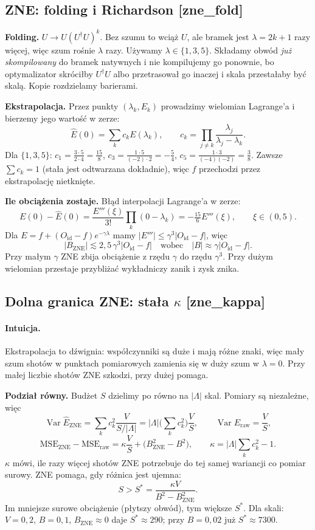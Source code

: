 \documentclass[11pt,a4paper]{article}
\newcommand{\slid}[1]{\hfill{\normalfont\small\ttfamily\color{axbluedk}[#1]}}
\newcommand{\Oid}{O_{\mathrm{id}}}
\newcommand{\Var}{\operatorname{Var}}
\newcommand{\intu}{\paragraph{Intuicja.}}
\begin{document}
\subsection{ZNE: folding i Richardson \slid{zne\_fold}}

\textbf{Folding.} $U\to U(U^\dagger U)^k$. Bez szumu to wciąż $U$, ale bramek jest
$\lambda=2k+1$ razy więcej, więc szum rośnie $\lambda$ razy. Używamy $\lambda\in\{1,3,5\}$.
Składamy obwód \emph{już skompilowany} do bramek natywnych i nie kompilujemy go ponownie, bo
optymalizator skróciłby $U^\dagger U$ albo przetrasował go inaczej i skala przestałaby być skalą.
Kopie rozdzielamy barierami.

\textbf{Ekstrapolacja.} Przez punkty $(\lambda_k,E_k)$ prowadzimy wielomian Lagrange'a i bierzemy
jego wartość w zerze:
\[
  \hat E(0)=\sum_kc_kE(\lambda_k),\qquad c_k=\prod_{j\ne k}\frac{\lambda_j}{\lambda_j-\lambda_k}.
\]
Dla $\{1,3,5\}$: $c_1=\frac{3\cdot5}{2\cdot4}=\frac{15}8$, $c_3=\frac{1\cdot5}{(-2)\cdot2}=-\frac54$,
$c_5=\frac{1\cdot3}{(-4)(-2)}=\frac38$. Zawsze $\sum c_k=1$ (stała jest odtwarzana dokładnie), więc
$f$ przechodzi przez ekstrapolację nietknięte.

\textbf{Ile obciążenia zostaje.} Błąd interpolacji Lagrange'a w zerze:
\[
  E(0)-\hat E(0)=\frac{E'''(\xi)}{3!}\prod_k(0-\lambda_k)=-\tfrac{15}{6}E'''(\xi),\qquad\xi\in(0,5).
\]
Dla $E=f+(\Oid-f)e^{-\gamma\lambda}$ mamy $|E'''|\le\gamma^3|\Oid-f|$, więc
\[
  |B_{\text{ZNE}}|\lesssim2{,}5\,\gamma^3|\Oid-f|\quad\text{wobec}\quad|B|\approx\gamma|\Oid-f| .
\]
Przy małym $\gamma$ ZNE zbija obciążenie z rzędu $\gamma$ do rzędu $\gamma^3$. Przy dużym
wielomian przestaje przybliżać wykładniczy zanik i zysk znika.

\subsection{Dolna granica ZNE: stała $\kappa$ \slid{zne\_kappa}}

\intu Ekstrapolacja to dźwignia: współczynniki są duże i mają różne znaki, więc mały szum shotów
w punktach pomiarowych zamienia się w duży szum w $\lambda=0$. Przy małej liczbie shotów ZNE
szkodzi, przy dużej pomaga.

\textbf{Podział równy.} Budżet $S$ dzielimy po równo na $|\Lambda|$ skal. Pomiary są niezależne,
więc
\[
  \Var\hat E_{\text{ZNE}}=\sum_kc_k^2\frac{V}{S/|\Lambda|}=|\Lambda|\Big(\sum_kc_k^2\Big)\frac VS,
  \qquad \Var E_{\text{raw}}=\frac VS,
\]
\[
  \mathrm{MSE}_{\text{ZNE}}-\mathrm{MSE}_{\text{raw}}=\kappa\frac VS+\big(B_{\text{ZNE}}^2-B^2\big),
  \qquad \kappa=|\Lambda|\sum_kc_k^2-1 .
\]
$\kappa$ mówi, ile razy więcej shotów ZNE potrzebuje do tej samej wariancji co pomiar surowy.
ZNE pomaga, gdy różnica jest ujemna:
\[
  S>S^*=\frac{\kappa V}{B^2-B_{\text{ZNE}}^2}.
\]
Im mniejsze surowe obciążenie (płytszy obwód), tym większe $S^*$. Dla skali: $V=0{,}2$,
$B=0{,}1$, $B_{\text{ZNE}}\approx0$ daje $S^*\approx290$; przy $B=0{,}02$ już $S^*\approx7300$.
\end{document}

